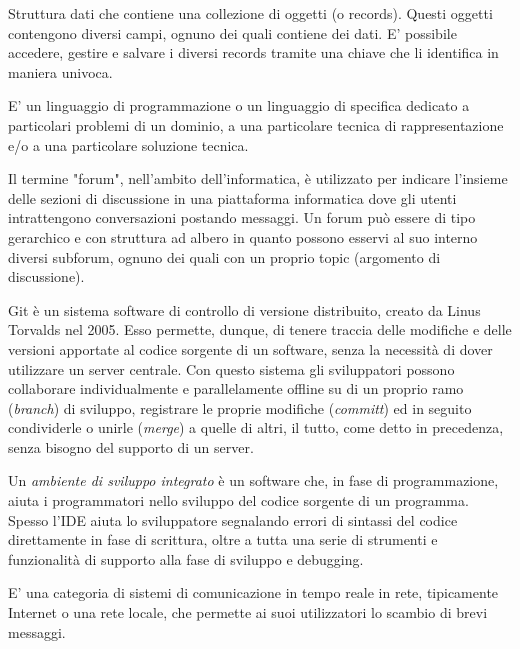 \documentclass{scalatekids-article}
\begin{document}
 Struttura dati che contiene una collezione di oggetti (o records).
Questi oggetti contengono diversi campi, ognuno dei quali contiene dei dati.
E' possibile accedere, gestire e salvare i diversi records tramite una chiave che li identifica in maniera univoca.

 E' un linguaggio di programmazione o un linguaggio di specifica dedicato a particolari problemi di un dominio, a una particolare tecnica di rappresentazione e/o a una particolare soluzione tecnica.



 Il termine "forum", nell'ambito dell'informatica, è utilizzato per indicare l'insieme delle sezioni di discussione in una piattaforma informatica dove gli utenti intrattengono conversazioni postando messaggi.
Un forum può essere di tipo gerarchico e con struttura ad albero in quanto possono esservi al suo interno diversi subforum, ognuno dei quali con un proprio topic (argomento di discussione).


 Git è un sistema software di controllo di versione distribuito, creato da Linus Torvalds nel 2005.
Esso permette, dunque, di tenere traccia delle modifiche e delle versioni apportate al codice sorgente di un software, senza la necessità di dover utilizzare un server centrale.
Con questo sistema gli sviluppatori possono collaborare individualmente e parallelamente offline su di un proprio ramo (\textit{branch}) di sviluppo, registrare le proprie modifiche (\textit{committ}) ed in seguito condividerle o unirle (\textit{merge}) a quelle di altri, il tutto, come detto in precedenza, senza bisogno del supporto di un server.



 Un \textit{ambiente di sviluppo integrato} è un software che, in fase di programmazione, aiuta i programmatori nello sviluppo del codice sorgente di un programma. Spesso l'IDE aiuta lo sviluppatore segnalando errori di sintassi del codice direttamente in fase di scrittura, oltre a tutta una serie di strumenti e funzionalità di supporto alla fase di sviluppo e debugging.

 E' una categoria di sistemi di comunicazione in tempo reale in rete, tipicamente Internet o una rete locale, che permette ai suoi utilizzatori lo scambio di brevi messaggi.
\end{document}
